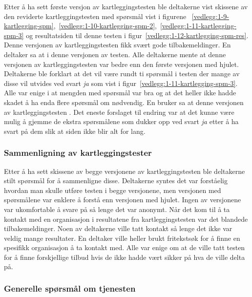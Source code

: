 Etter å ha sett første versjon av kartleggingstesten ble deltakerne vist skissene av den reviderte kartleggingstesten med spørsmål vist i figurene ~\ref{vedlegg:1-9-kartlegging-spm},~\ref{vedlegg:1-10-kartlegging-spm-2},~\ref{vedlegg:1-11-kartlegging-spm-3} og resultatsiden til denne testen i figur~\ref{vedlegg:1-12-kartlegging-spm-res}. Denne versjonen av kartleggingstesten fikk svært gode tilbakemeldinger. En deltaker sa at  i denne versjonen av testen. Alle deltakerne mente at denne versjonen av kartleggingstesten var bedre enn den første versjonen med hjulet. Deltakerne ble forklart at det vil være rundt ti spørsmål i testen der mange av disse vil utvides ved svart {\em  ja} som vist i figur~\ref{vedlegg:1-11-kartlegging-spm-3}. Alle var enige i at mengden med spørsmål var bra og at det heller ikke hadde skadet å ha enda flere spørsmål om nødvendig. En bruker sa at denne versjonen av kartleggingstesten . Det eneste forslaget til endring var at det kunne være mulig å gjemme de ekstra spørsmålene som dukker opp ved svart {\em  ja} etter å ha svart på dem slik at siden ikke blir alt for lang.


\subsubsection{Sammenligning av kartleggingstester}

Etter å ha sett skissene av begge versjonene av kartleggingstesten ble deltakerne stilt spørsmål for å sammenligne disse. Deltakerne syntes det var forståelig hvordan man skulle utføre testen i begge versjonene, men versjonen med spørsmålene var enklere å forstå enn versjonen med hjulet. Ingen av versjonene var ukomfortable å svare på så lenge det var anonymt. Når det kom til å ta kontakt med en organisasjon i resultatene fra kartleggingstesten var det blandede tilbakemeldinger. Noen av deltakerne ville tatt kontakt så lenge det ikke var veldig mange resultater. En deltaker ville heller brukt fritekstsøk for å finne en spesifikk organisasjon å ta kontakt med. Alle var enige om at de ville tatt testen for å finne forskjellige tilbud hvis de ikke hadde vært sikker på hva de ville delta på.

\subsubsection{Generelle spørsmål om tjenesten}

